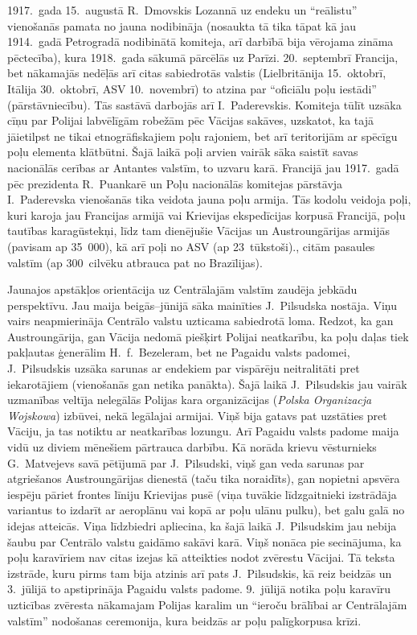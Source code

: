 \documentclass[twoside,a5paper,12pt,fleqn,openany]{extbook}
\newcommand{\pltxti}[1]{\textit{\textpolish{#1}}}
\begin{document}
1917.~gada 15.~augustā R.~Dmovskis Lozannā uz endeku un ``reālistu'' vienošanās pamata no jauna nodibināja  (nosaukta tā tika tāpat kā jau 1914.~gadā Petrogradā nodibinātā komiteja, arī darbībā bija vērojama zināma pēctecība), kura 1918.~gada sākumā pārcēlās uz Parīzi. 20.~septembrī Francija, bet nākamajās nedēļās arī citas sabiedrotās valstis (Lielbritānija 15.~oktobrī, Itālija 30.~oktobrī, ASV 10.~novembrī) to atzina par ``oficiālu poļu iestādi'' (pārstāvniecību). Tās sastāvā darbojās arī I.~Paderevskis. Komiteja tūlīt uzsāka cīņu par Polijai labvēlīgām robežām pēc Vācijas sakāves, uzskatot, ka tajā jāietilpst ne tikai etnogrāfiskajiem poļu rajoniem, bet arī teritorijām ar spēcīgu poļu elementa klātbūtni. Šajā laikā poļi arvien vairāk sāka saistīt savas nacionālās cerības ar Antantes valstīm, to uzvaru karā. Francijā jau 1917.~gadā pēc prezidenta R.~Puankarē un Poļu nacionālās komitejas pārstāvja I.~Paderevska vienošanās tika veidota jauna poļu armija. Tās kodolu veidoja poļi, kuri karoja jau Francijas armijā vai Krievijas ekspedīcijas korpusā Francijā, poļu tautības karagūstekņi, līdz tam dienējušie Vācijas un Austroungārijas armijās (pavisam ap 35~000), kā arī poļi no ASV (ap 23~tūkstoši)., citām pasaules valstīm (ap 300~cilvēku atbrauca pat no Brazīlijas).

Jaunajos apstākļos orientācija uz Centrālajām valstīm zaudēja jebkādu perspektīvu. Jau maija beigās--jūnijā sāka mainīties J.~Pilsudska nostāja. Viņu vairs neapmierināja Centrālo valstu uzticama sabiedrotā loma. Redzot, ka gan Austroungārija, gan Vācija nedomā piešķirt Polijai neatkarību, ka poļu daļas tiek pakļautas ģenerālim H.~f.~Bezeleram, bet ne Pagaidu valsts padomei, J.~Pilsudskis uzsāka sarunas ar endekiem par vispārēju neitralitāti pret iekarotājiem (vienošanās gan netika panākta). Šajā laikā J.~Pilsudskis jau vairāk uzmanības veltīja nelegālās Polijas kara organizācijas (\pltxti{Polska Organizacja Wojskowa}) izbūvei, nekā legālajai armijai. Viņš bija gatavs pat uzstāties pret Vāciju, ja tas notiktu ar neatkarības lozungu. Arī Pagaidu valsts padome maija vidū uz diviem mēnešiem pārtrauca darbību. Kā norāda krievu vēsturnieks G.~Matvejevs savā pētījumā par J.~Pilsudski, viņš gan veda sarunas par atgriešanos Austroungārijas dienestā (taču tika noraidīts), gan nopietni apsvēra iespēju pāriet frontes līniju Krievijas pusē (viņa tuvākie līdzgaitnieki izstrādāja variantus to izdarīt ar aeroplānu vai kopā ar poļu ulānu pulku), bet galu galā no idejas atteicās. Viņa līdzbiedri apliecina, ka šajā laikā J.~Pilsudskim jau nebija šaubu par Centrālo valstu gaidāmo sakāvi karā. Viņš nonāca pie secinājuma, ka poļu karavīriem nav citas izejas kā atteikties nodot zvērestu Vācijai. Tā teksta izstrāde, kuru pirms tam bija atzinis arī pats J.~Pilsudskis, kā reiz beidzās un 3.~jūlijā to apstiprināja Pagaidu valsts padome. 9.~jūlijā notika poļu karavīru uzticības zvēresta nākamajam Polijas karalim un ``ieroču brālībai ar Centrālajām valstīm'' nodošanas ceremonija, kura beidzās ar poļu palīgkorpusa krīzi.
\end{document}

